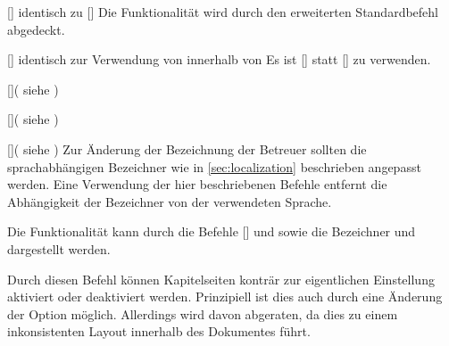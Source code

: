 \begin{Entity*}{}
\begin{Declaration}{[]}{%
  identisch zu []%
}
\printdeclarationlist%
%
Die Funktionalität wird durch den erweiterten Standardbefehl  
abgedeckt.
\end{Declaration}

\begin{Declaration}{[]}{%
  identisch zur Verwendung von  innerhalb von %
}
\printdeclarationlist%
%
Es ist []
statt [] zu verwenden.
\end{Declaration}

\begin{Declaration}{[]}(%
  siehe %
)
\begin{Declaration}{[]}(%
  siehe %
)
\begin{Declaration}{[]}(%
  siehe %
)
\printdeclarationlist%
%
Zur Änderung der Bezeichnung der Betreuer sollten die sprachabhängigen 
Bezeichner wie in \autoref{sec:localization} beschrieben angepasst werden. Eine 
Verwendung der hier beschriebenen Befehle entfernt die Abhängigkeit der 
Bezeichner von der verwendeten Sprache.
\end{Declaration}
\end{Declaration}
\end{Declaration}

\begin{Declaration}{}
\printdeclarationlist%
%
Die Funktionalität kann durch die Befehle [] und 
 sowie die Bezeichner  und 
 dargestellt werden.
\end{Declaration}

\begin{Declaration}{}
\printdeclarationlist%
%
Durch diesen Befehl können Kapitelseiten konträr zur eigentlichen Einstellung 
aktiviert oder deaktiviert werden. Prinzipiell ist dies auch durch eine 
Änderung der Option  möglich. Allerdings wird davon 
abgeraten, da dies zu einem inkonsistenten Layout innerhalb des Dokumentes 
führt.
\end{Declaration}


\end{Entity*}
